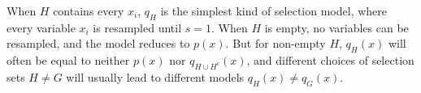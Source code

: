 \documentclass{article}
\theoremstyle{plain}
\theoremstyle{definition}
\newtheorem{prop}[theorem]{Proposition}
\begin{document}
When $H$ contains every $x_i$, $q_H$ is the simplest kind of selection model, where every variable $x_i$ is resampled until $s=1$. When $H$ is empty, no variables can be resampled, and the model reduces to $p(x)$. But for non-empty $H$, $q_{H}(x)$ will often be equal to neither $p(x)$ nor $q_{H\cup H^c}(x)$, and different choices of selection sets $H\neq G$ will usually lead to different models $q_{H}(x)\neq q_{G}(x)$.




\end{document}
